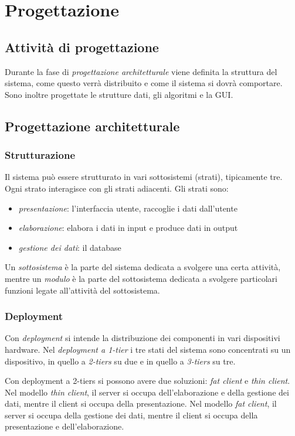 \documentclass[11pt]{article}
\begin{document}
\section{Progettazione}
\subsection{Attività di progettazione}
Durante la fase di \textit{progettazione architetturale} viene definita la struttura del sistema, come questo verrà 
distribuito e come il sistema si dovrà comportare. Sono inoltre progettate le strutture dati, gli algoritmi e la GUI.
\subsection{Progettazione architetturale}
\subsubsection*{Strutturazione}
Il sistema può essere strutturato in vari sottosistemi (strati), tipicamente tre. Ogni strato interagisce con gli strati 
adiacenti. Gli strati sono:
\begin{itemize}
    \item \textit{presentazione}: l'interfaccia utente, raccoglie i dati dall'utente
    \item \textit{elaborazione}:  elabora i dati in input e produce dati in output
    \item \textit{gestione dei dati}: il database
\end{itemize}

Un \textit{sottosistema} è la parte del sistema dedicata a svolgere una certa attività, mentre un \textit{modulo} è la 
parte del sottosistema dedicata a svolgere particolari funzioni legate all'attività del sottosistema.
\subsubsection*{Deployment}
Con \textit{deployment} si intende la distribuzione dei componenti in vari dispositivi hardware. Nel \textit{deployment 
a 1-tier} i tre stati del sistema sono concentrati su un dispositivo, in quello a \textit{2-tiers} su due e in quello a 
\textit{3-tiers} su tre.

Con deployment a 2-tiers si possono avere due soluzioni: \textit{fat client} e \textit{thin client}.
Nel modello \textit{thin client}, il server si occupa dell'elaborazione e della gestione dei dati, mentre il client si 
occupa della presentazione.
Nel modello \textit{fat client}, il server si occupa della gestione dei dati, mentre il client si occupa della presentazione 
e dell'elaborazione.
\end{document}
